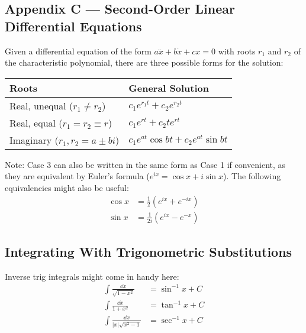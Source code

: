 \documentclass{article}
\begin{document}
\insertTitle

\subsection*{Appendix C --- Second-Order Linear Differential Equations}

Given a differential equation of the form $a\ddot{x} + b\dot{x} + cx = 0$ with roots $r_1$ and $r_2$ of the characteristic polynomial, there are three possible forms for the solution:
\begin{table}[H]
	\centering
	\begin{tabular}{ll}
		\textbf{Roots} & \textbf{General Solution} \\
		\midrule
		Real, unequal ($r_1 \ne r_2$) & $c_1e^{r_1t} + c_2e^{r_2t}$ \\
		Real, equal ($r_1 = r_2 \equiv r$) & $c_1e^{rt} + c_2te^{rt}$ \\
		Imaginary ($r_1, r_2 = a \pm bi$) & $c_1e^{at}\cos bt + c_2e^{at}\sin bt$ \\
	\end{tabular}
\end{table}

Note: Case 3 can also be written in the same form as Case 1 if convenient, as they are equivalent by Euler's formula ($e^{ix} = \cos x + i\sin x$). The following equivalencies might also be useful:
\begin{equation*}
\begin{aligned}
\cos x &= \frac{1}{2}(e^{ix} + e^{-ix}) \\
\sin x &= \frac{1}{2i}(e^{ix}-e^{-x})
\end{aligned}
\end{equation*}

\subsection*{Integrating With Trigonometric Substitutions}

Inverse trig integrals might come in handy here:
\begin{equation*}
\begin{aligned}
\int\frac{\dd x}{\sqrt{1-x^2}} &= \sin^{-1}x + C \\
\int\frac{\dd x}{1+x^2} &= \tan^{-1}x + C \\
\int\frac{\dd x}{|x|\sqrt{x^2-1}} &= \sec^{-1}x + C
\end{aligned}
\end{equation*}
\end{document}
